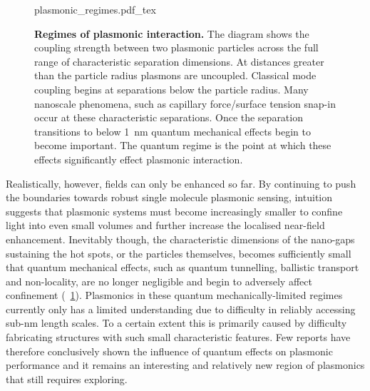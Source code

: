 \documentclass[12pt, a4paper, twoside]{book}
\begin{document}
\begin{figure}[bt]
\centering
\fontsize{10pt}{1em}\selectfont
{plasmonic_regimes.pdf_tex}
\caption[Regimes of plasmonic interaction.]{\textbf{Regimes of plasmonic interaction.} The diagram shows the coupling strength between two plasmonic particles across the full range of characteristic separation dimensions. At distances greater than the particle radius plasmons are uncoupled. Classical mode coupling begins at separations below the particle radius. Many nanoscale phenomena, such as capillary force/surface tension snap-in occur at these characteristic separations. Once the separation transitions to below \SI{1}{nm} quantum mechanical effects begin to become important. The quantum regime is the point at which these effects significantly effect plasmonic interaction.}
\label{fig:plasmonic_regimes}
\vspace{-10pt}
\end{figure}

Realistically, however, fields can only be enhanced so far. By continuing to push the boundaries towards robust single molecule plasmonic sensing, intuition suggests that plasmonic systems must become increasingly smaller to confine light into even small volumes and further increase the localised near-field enhancement. Inevitably though, the characteristic dimensions of the nano-gaps sustaining the hot spots, or the particles themselves, becomes sufficiently small that quantum mechanical effects, such as quantum tunnelling, ballistic transport and non-locality, are no longer negligible and begin to adversely affect confinement (\figurename~\ref{fig:plasmonic_regimes}). Plasmonics in these quantum mechanically-limited regimes currently only has a limited understanding due to difficulty in reliably accessing sub-nm length scales. To a certain extent this is primarily caused by difficulty fabricating structures with such small characteristic features. Few reports have therefore conclusively shown the influence of quantum effects on plasmonic performance and it remains an interesting and relatively new region of plasmonics that still requires exploring.
\end{document}
